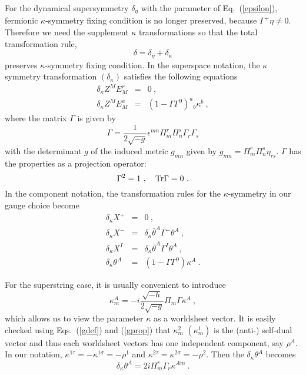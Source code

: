 \documentclass[a4paper,12pt]{article}
\begin{document}
For the dynamical supersymmetry $\delta_\eta$ with the parameter of
Eq.~(\ref{epsilon}), fermionic $\kappa$-symmetry fixing condition is
no longer preserved, because $\Gamma^+ \eta \neq 0$. Therefore we need
the supplement $\kappa$ transformations so that the total
transformation rule,
\[
\delta = \delta_\eta + \delta_\kappa
\]
preserves $\kappa$-symmetry fixing condition.
In the superspace notation, the $\kappa$ symmetry transformation
$(\delta_\kappa)$ satisfies the following equations
\begin{eqnarray}
\delta_\kappa Z^M E_M^r &=& 0~, \nonumber \\
\delta_\kappa Z^M E_M^a &=& (1-\Gamma \Gamma^9)^a{}_b \kappa^b~,
\end{eqnarray}
where the matrix $\Gamma$ is given by
\begin{equation}
\Gamma = \frac{1}{2 \sqrt{-g}} \epsilon^{mn} 
     \Pi_m^r \Pi_n^s \Gamma_r \Gamma_s
\label{gdef}
\end{equation}
with the determinant $g$ of the induced metric $g_{mn}$ given by
$g_{mn}=\Pi_m^r \Pi_n^s \eta_{rs}$.  $\Gamma$ has the properties as a
projection operator:
\begin{equation}
\Gamma^2 = 1 ~,~~~{\rm Tr} \Gamma = 0 ~.
\label{gprop}
\end{equation}
In the component notation, the transformation rules for the
$\kappa$-symmetry in our gauge choice become
\begin{eqnarray}
\delta_\kappa X^+ &=& 0 ~,   \nonumber \\
\delta_\kappa X^- 
  &=& \delta_\kappa \bar{\theta}^A \Gamma^- \theta^A ~,
                           \nonumber \\
\delta_\kappa X^I 
  &=&  \delta_\kappa \bar{\theta}^A \Gamma^I \theta^A ~,
                           \nonumber \\
\delta_\kappa \theta^A &=& (1-\Gamma \Gamma^9) \kappa^A ~.
\end{eqnarray}

For the superstring case, it is usually convenient to introduce
\begin{equation}
\kappa^A_m = -i \frac{\sqrt{-h}}{2 \sqrt{-g}} \Pi_m \Gamma \kappa^A ~,
\end{equation}
which allows us to view the parameter $\kappa$ as a worldsheet vector.
It is easily checked using Eqs.~(\ref{gdef}) and (\ref{gprop}) that
$\kappa^2_m$ $(\kappa^1_m)$ is the (anti-) self-dual vector and thus
each worldsheet vectors has one independent component, say $\rho^A$.
In our notation, $\kappa^{1\tau}=-\kappa^{1\sigma} = -\rho^1$ and
$\kappa^{2\tau}=\kappa^{2\sigma} = -\rho^2$.  Then the $\delta_\kappa
\theta^A$ becomes
\begin{equation}
\delta_\kappa \theta^A = 2 i \Pi_m^r \Gamma_r \kappa^{Am}~.
\end{equation}
\end{document}
